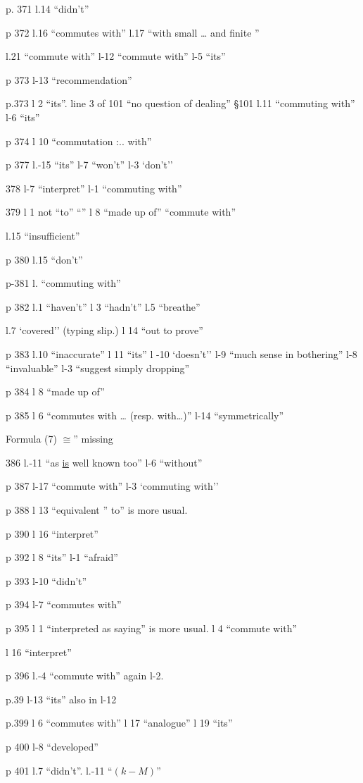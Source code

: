 
p. 371 l.14 ``didn't''

p 372 l.16 ``commutes with'' \quad l.17 ``with small \ldots{} and finite ''

l.21 ``commute with'' \quad l-12 ``commute with'' \quad l-5 ``its''

p 373 l-13 ``recommendation''

p.373 l 2 ``its''. \quad line 3 of 101 ``no question of dealing'' \quad \S101 l.11 ``commuting with'' \quad l-6 ``its''

p 374 l 10 ``commutation :.. with''

p 377 l.-15 ``its'' \quad l-7 ``won't'' \quad l-3 `don't''

378 l-7 ``interpret'' \quad l-1 ``commuting with''

379 l 1 not ``to'' ``'' \quad l 8 ``made up of'' \quad ``commute with''

l.15 ``insufficient''

p 380 l.15 ``don't''

p-381 l. ``commuting with''

p 382 l.1 ``haven't'' \quad l 3 ``hadn't'' \quad l.5 ``breathe''

l.7 `covered'' (typing slip.) \quad l 14 ``out to prove''

p 383 l.10 ``inaccurate'' \quad l 11 ``its'' \quad l -10 `doesn't'' \quad l-9 ``much sense in bothering'' \quad l-8 ``invaluable'' \quad l-3 ``suggest simply dropping''

p 384 l 8 ``made up of''

p 385 l 6 ``commutes with \ldots{} (resp. with\ldots{})'' \quad l-14 ``symmetrically''

Formula (7) $\cong$'' missing

386 l.-11 ``as \uline{is} well known too'' \quad l-6 ``without''

p 387 l-17 ``commute with'' \quad l-3 `commuting with''

p 388 l 13 ``equivalent '' to'' is more usual.

p 390 l 16 ``interpret''

p 392 l 8 ``its'' \quad l-1 ``afraid''

p 393 l-10 ``didn't''

p 394 l-7 ``commutes with''

p 395 l 1 ``interpreted as saying'' is more usual. \quad l 4 ``commute with''

l 16 ``interpret''

p 396 l.-4 ``commute with'' again l-2.

p.39 l-13 ``its'' also in l-12

p.399 l 6 ``commutes with'' \quad l 17 ``analogue'' \quad l 19 ``its''

p 400 l-8 ``developed''

p 401 l.7 ``didn't''. \quad l.-11 ``$(k-M)$''
